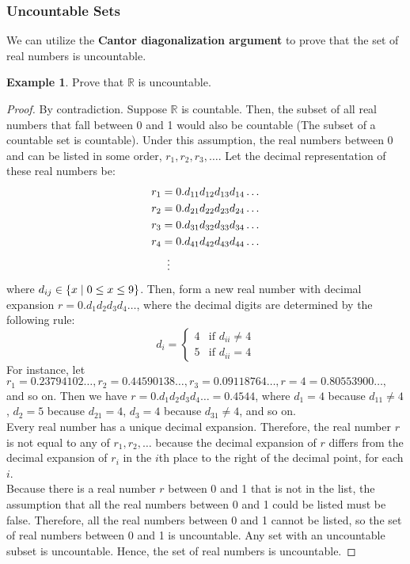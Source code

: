 \documentclass[article, 11pt]{article}
\theoremstyle{definition}
\newtheorem{example}{Example}[subsubsection]
\DeclarePairedDelimiter\set{\{}{\}}
\newcommand{\reals}{\mathbb{R}}
\begin{document}
    \subsubsection{Uncountable Sets}
    We can utilize the \textbf{Cantor diagonalization argument} to prove that the set of real numbers is uncountable.
    \begin{example}
        Prove that $\reals$ is uncountable. 
        \begin{proof} By contradiction. 
            Suppose $\reals$ is countable. Then, the subset of all real numbers that fall between 0 and 1 would also be countable (The subset of a countable set is countable). Under this assumption, the real numbers between 0 and  can be listed in some order, $r_1, r_2, r_3, \dots$. Let the decimal representation of these real numbers be: 
            \begin{align*}
                r_1 &= 0.d_{11}d_{12}d_{13}d_{14}\dots \\
                r_2 &= 0.d_{21}d_{22}d_{23}d_{24}\dots \\
                r_3 &= 0.d_{31}d_{32}d_{33}d_{34}\dots \\
                r_4 &= 0.d_{41}d_{42}d_{43}d_{44}\dots \\
                    &\vdotswithin{=}
            \end{align*}
            where $d_{ij} \in \set*{x \mid 0 \leq x \leq 9}$. Then, form a new real number with decimal expansion $r=0.d_1d_2d_3d_4\dots$, where the decimal digits are determined by the following rule:
            \begin{equation*}
                d_i = \begin{cases}
                            4 & \text{if } d_{ii} \neq 4 \\
                            5 & \text{if } d_{ii} = 4
                        \end{cases}
            \end{equation*}
            For instance, let $r_1 = 0.23794102\dots, r_2=0.44590138\dots, r_3=0.09118764\dots, r=4=0.80553900\dots,$ and so on. Then we have $r=0.d_1d_2d_3d_4\dots=0.4544$, where $d_1=4$ because $d_{11} \neq 4$, $d_2=5$ because $d_{21}=4$, $d_3=4$ because $d_{31} \neq 4$, and so on. \\
            
            Every real number has a unique decimal expansion. Therefore, the real number $r$ is not equal to any of $r_1,r_2,\dots$ because the decimal expansion of $r$ differs from the decimal expansion of $r_i$ in the $i$th place to the right of the decimal point, for each $i$. \\

            Because there is a real number $r$ between 0 and 1 that is not in the list, the assumption that all the real numbers between 0 and 1 could be listed must be false. Therefore, all the real numbers between 0 and 1 cannot be listed, so the set of real numbers between 0 and 1 is uncountable. Any set with an uncountable subset is uncountable. Hence, the set of real numbers is uncountable.
        \end{proof}
    \end{example}
\end{document}
